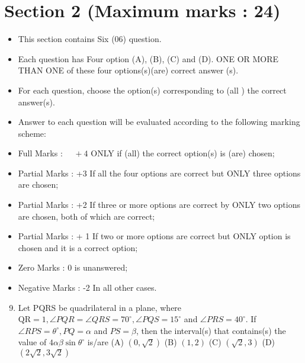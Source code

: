 \documentclass[10pt]{article}
\begin{document}
\section{Section 2 (Maximum marks : 24)}
\begin{itemize}
  \item This section contains Six (06) question.

  \item Each question has Four option (A), (B), (C) and (D). ONE OR MORE THAN ONE of these four options(s)(are) correct answer (s).

  \item For each question, choose the option(s) corresponding to (all ) the correct answer(s).

  \item Answer to each question will be evaluated according to the following marking scheme:

  \item Full Marks : $\quad+4$ ONLY if (all) the correct option(s) is (are) chosen;

  \item Partial Marks : +3 If all the four options are correct but ONLY three options are chosen;

  \item Partial Marks : +2 If three or more options are correct by ONLY two options are chosen, both of which are correct;

  \item Partial Marks : + 1 If two or more options are correct but ONLY option is chosen and it is a correct option;

  \item Zero Marks : 0 is unanswered;

  \item Negative Marks : -2 In all other cases.

\end{itemize}

\begin{enumerate}
  \setcounter{enumi}{8}
  \item Let PQRS be quadrilateral in a plane, where $\mathrm{QR}=1, \angle P Q R=\angle Q R S=70^{\circ}, \angle P Q S=15^{\circ}$ and $\angle P R S=40^{\circ}$. If $\angle R P S=\theta^{\circ}, P Q=\alpha$ and $P S=\beta$, then the interval(s) that contains(s) the value of $4 \alpha \beta \sin \theta^{\circ}$ is/are
(A) $(0, \sqrt{2})$
(B) $(1,2)$
(C) $(\sqrt{2}, 3)$
(D) $(2 \sqrt{2}, 3 \sqrt{2})$
\end{enumerate}
\end{document}
